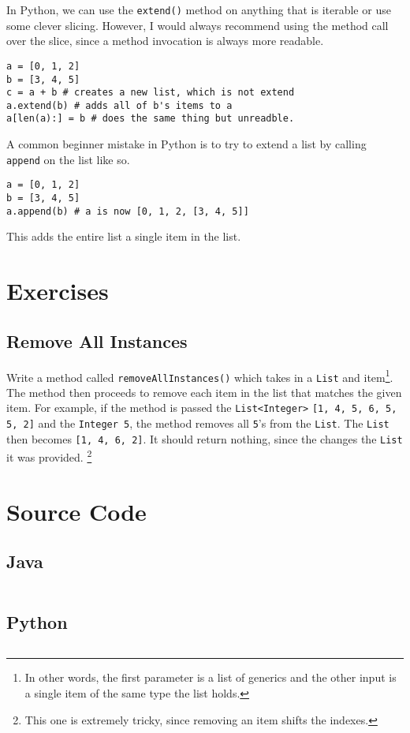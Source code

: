In Python, we can use the \texttt{extend()} method on anything that is iterable or use some clever slicing.  However, I would always recommend using the method call over the slice, since a method invocation is always more readable.


\begin{verbatim}
a = [0, 1, 2]
b = [3, 4, 5]
c = a + b # creates a new list, which is not extend
a.extend(b) # adds all of b's items to a
a[len(a):] = b # does the same thing but unreadble.
\end{verbatim}
A common beginner mistake in Python is to try to extend a list by calling \texttt{append} on the list like so.

\begin{verbatim}
a = [0, 1, 2]
b = [3, 4, 5]
a.append(b) # a is now [0, 1, 2, [3, 4, 5]]
\end{verbatim}



This adds the entire list a single item in the list.  

\newpage

\section{Exercises}


\subsection{Remove All Instances}
\label{ex-remove-all}
Write a method called \texttt{removeAllInstances()} which takes in a \texttt{List} and item\footnote{In other words, the first parameter is a list of generics and the other input is a single item of the same type the list holds.}.
The method then proceeds to remove each item in the list that matches the given item.
For example, if the method is passed the \texttt{List<Integer>} \texttt{[1, 4, 5, 6, 5, 5, 2]} and the \texttt{Integer }\texttt{5}, the method removes all \texttt{5}'s from the \texttt{List}.
The \texttt{List} then becomes \texttt{[1, 4, 6, 2]}.
It should return nothing, since the changes the \texttt{List} it was provided.
\footnote{This one is extremely tricky, since removing an item shifts the indexes.}
\newpage
\section{Source Code}
\subsection{Java}
\inputminted{Java}{code/MyArrayList.java}
\newpage
\subsection{Python}
\inputminted{Python3}{code/arraylist.py}